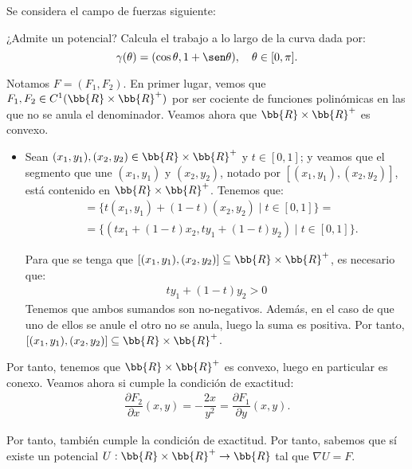 \documentclass[12pt]{article}
\begin{document}
    \begin{ejercicio}
        Se considera el campo de fuerzas siguiente:

        ¿Admite un potencial? Calcula el trabajo a lo largo de la curva dada por:
        \begin{equation*}
            \gamma(\theta) = (\cos \theta, 1 + \sen \theta), \quad \theta \in [0,\pi].
        \end{equation*}

        Notamos $F=(F_1,F_2)$. En primer lugar, vemos que $F_1,F_2\in C^1(\bb{R}\times \bb{R}^+)$ por ser cociente de funciones polinómicas en las que no se anula el denominador. Veamos ahora que $\bb{R}\times \bb{R}^+$ es convexo.
        \begin{itemize}
            \item Sean $(x_1,y_1),(x_2,y_2)\in \bb{R}\times \bb{R}^+$ y $t \in [0,1]$; y veamos que el segmento que une $(x_1,y_1)$ y $(x_2,y_2)$, notado por $[(x_1,y_1),(x_2,y_2)]$, está contenido en $\bb{R}\times \bb{R}^+$. Tenemos que:
            \begin{align*}
                [(x_1,y_1),(x_2,y_2)]
                &= \{t(x_1,y_1) + (1-t)(x_2,y_2) \mid t \in [0,1]\}
                =\\&= \{(tx_1 + (1-t)x_2,ty_1 + (1-t)y_2) \mid t \in [0,1]\}.
            \end{align*}

            Para que se tenga que $[(x_1,y_1),(x_2,y_2)]\subseteq \bb{R}\times \bb{R}^+$, es necesario que:
            \begin{align*}
                ty_1 + (1-t)y_2 > 0
            \end{align*}
            Tenemos que ambos sumandos son no-negativos. Además, en el caso de que uno de ellos se anule el otro no se anula, luego la suma es positiva. Por tanto, $[(x_1,y_1),(x_2,y_2)]\subseteq \bb{R}\times \bb{R}^+$.
        \end{itemize}

        Por tanto, tenemos que $\bb{R}\times \bb{R}^+$ es convexo, luego en particular es conexo. Veamos ahora si cumple la condición de exactitud:
        \begin{align*}
            \dfrac{\partial F_2}{\partial x}(x,y) = -\dfrac{2x}{y^2} = \dfrac{\partial F_1}{\partial y}(x,y).
        \end{align*}

        Por tanto, también cumple la condición de exactitud. Por tanto, sabemos que sí existe un potencial $U:\bb{R}\times \bb{R}^+\to \bb{R}$ tal que $\nabla U = F$.\\


\end{ejercicio}
\end{document}
